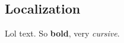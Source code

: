 \documentclass[Main]{subfiles}
\begin{document}
\subsection{Localization} %
	\label{sec:localization}

	Lol text.
	So \textbf{bold}, very \emph{cursive}.

\end{document}

